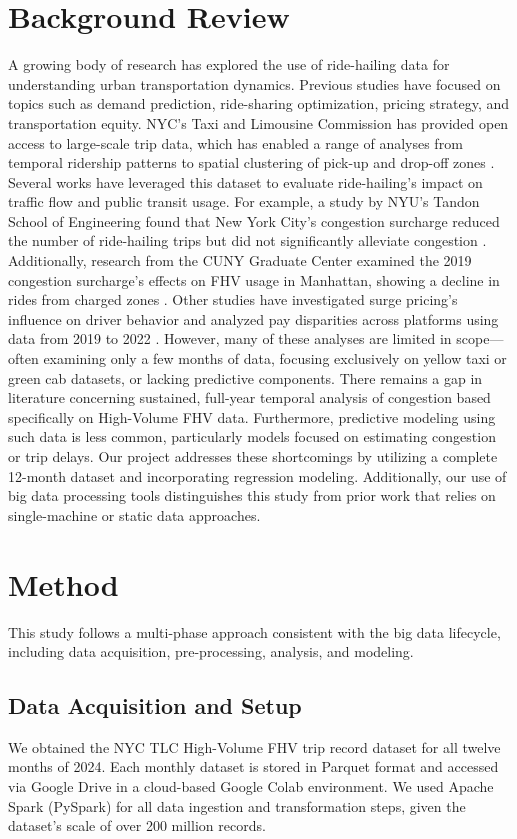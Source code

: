 \documentclass{article}
\begin{document}
\section{Background Review}

A growing body of research has explored the use of ride-hailing data for understanding urban transportation dynamics. Previous studies have focused on topics such as demand prediction, ride-sharing optimization, pricing strategy, and transportation equity. NYC’s Taxi and Limousine Commission has provided open access to large-scale trip data, which has enabled a range of analyses from temporal ridership patterns to spatial clustering of pick-up and drop-off zones \cite{nyctlc2023}.
Several works have leveraged this dataset to evaluate ride-hailing’s impact on traffic flow and public transit usage. For example, a study by NYU's Tandon School of Engineering found that New York City’s congestion surcharge reduced the number of ride-hailing trips but did not significantly alleviate congestion \cite{nyu2023}. Additionally, research from the CUNY Graduate Center examined the 2019 congestion surcharge’s effects on FHV usage in Manhattan, showing a decline in rides from charged zones \cite{cuny2023}.
Other studies have investigated surge pricing’s influence on driver behavior \cite{surgepricing2022} and analyzed pay disparities across platforms using data from 2019 to 2022 \cite{ucla2023}. However, many of these analyses are limited in scope—often examining only a few months of data, focusing exclusively on yellow taxi or green cab datasets, or lacking predictive components.
There remains a gap in literature concerning sustained, full-year temporal analysis of congestion based specifically on High-Volume FHV data. Furthermore, predictive modeling using such data is less common, particularly models focused on estimating congestion or trip delays. Our project addresses these shortcomings by utilizing a complete 12-month dataset and incorporating regression modeling. Additionally, our use of big data processing tools distinguishes this study from prior work that relies on single-machine or static data approaches.

\section{Method}
This study follows a multi-phase approach consistent with the big data lifecycle, including data acquisition, pre-processing, analysis, and modeling.

\subsection{Data Acquisition and Setup}
We obtained the NYC TLC High-Volume FHV trip record dataset for all twelve months of 2024. Each monthly dataset is stored in Parquet format and accessed via Google Drive in a cloud-based Google Colab environment. We used Apache Spark (PySpark) for all data ingestion and transformation steps, given the dataset's scale of over 200 million records.
\end{document}
